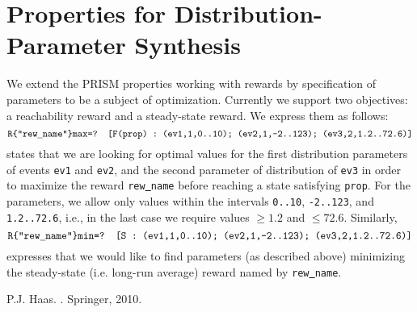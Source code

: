 \documentclass{article}
\newcommand{\eqdef}{\ensuremath{\stackrel{\text{\tiny def}}{=}}}
\renewcommand{\_}{\underline{~}}
\newcommand{\code}[1]{\texttt{#1}}
\begin{document}
%
%
%
%
%

\section*{Properties for Distribution-Parameter Synthesis}

We extend the PRISM properties working with rewards by specification of parameters to be a subject of optimization. Currently we support two objectives: a reachability reward and a steady-state reward. We express them as follows:
$$\code{R\{"rew\_name"\}max=? [F(prop)~:~(ev1,1,0..10); (ev2,1,-2..123); (ev3,2,1.2..72.6)]}$$ 
states that we are looking for optimal values for the first distribution parameters of events \code{ev1} and \code{ev2}, and the second parameter of distribution of \code{ev3} in order to  maximize the reward \code{rew\_name} before reaching a state satisfying \code{prop}. For the parameters, we allow only values within the intervals \code{0..10}, \code{-2..123}, and \code{1.2..72.6}, i.e., in the last case we require values $\geq 1.2$ and $\leq72.6$. Similarly,
$$\code{R\{"rew\_name"\}min=? [S~:~(ev1,1,0..10); (ev2,1,-2..123); (ev3,2,1.2..72.6)]}$$ 
expresses that we would like to find parameters (as described above) minimizing the steady-state (i.e. long-run average) reward named by \code{rew\_name}.


\begin{thebibliography}{1}
P.J. Haas.
.
\newblock Springer, 2010.
\end{thebibliography}
\end{document}
